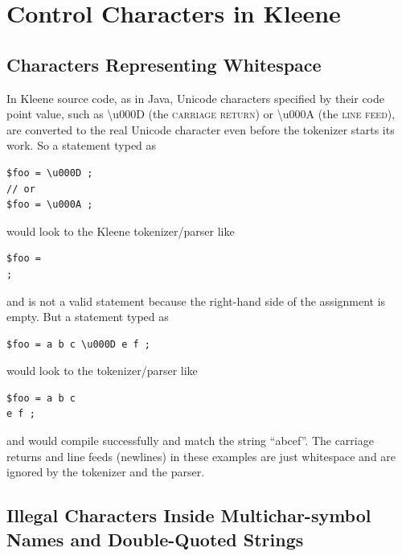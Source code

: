 \documentclass[letterpaper,12pt]{article}
\newcommand{\acro}{\textsc}
\begin{document}
\newpage

\section{Control Characters in Kleene}

\label{app:controlcharacters}

\subsection{Characters Representing Whitespace}

In Kleene source code, as in Java, Unicode characters specified by their
code point value, such as \textbackslash{}u000D (the \acro{carriage
return}) or \textbackslash{}u000A (the \acro{line feed}), are converted
to the real Unicode character even before the tokenizer starts its work.
So a statement typed as

\begin{Verbatim}[fontsize=\small]
$foo = \u000D ;
// or
$foo = \u000A ;
\end{Verbatim}

\noindent
would look to the Kleene tokenizer/parser like

\begin{Verbatim}[fontsize=\small]
$foo =
;
\end{Verbatim}

\noindent
and is not a valid statement because the right-hand side of the assignment is
empty.  But a statement typed as

\begin{Verbatim}[fontsize=\small]
$foo = a b c \u000D e f ;
\end{Verbatim}

\noindent
would look to the tokenizer/parser like

\begin{Verbatim}[fontsize=\small]
$foo = a b c
e f ;
\end{Verbatim}

\noindent
and would compile successfully and match the string ``abcef''.  The carriage
returns and line feeds (newlines) in these examples are just whitespace and
are ignored by the tokenizer and the parser.

\subsection{Illegal Characters Inside Multichar-symbol Names and
Double-Quoted Strings}
\end{document}

